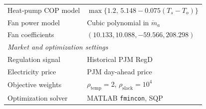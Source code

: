 \documentclass[journal]{IEEEtran}
\theoremstyle{remark}
\begin{document}
\begin{table}[t]
\begin{tabular}{p{} p{}}
			Heat-pump COP model & \(\max\{1.2,\,5.148-0.075(T_s-T_o)\}\) \\
			Fan power model & Cubic polynomial in \(\dot m_a\) \\
			Fan coefficients & \((10.133,10.088,-59.566,208.298)\) \\
			\midrule
			\multicolumn{2}{l}{\textit{Market and optimization settings}} \\
			Regulation signal & Historical PJM RegD \\
			Electricity price & PJM day-ahead price \\
			Objective weights & \(\rho_{\mathrm{temp}}=2\), \(\rho_{\mathrm{slack}}=10^4\) \\
			Optimization solver & MATLAB \texttt{fmincon}, SQP \\
			\bottomrule
		\end{tabular}
	\end{table}
	
\end{document}
